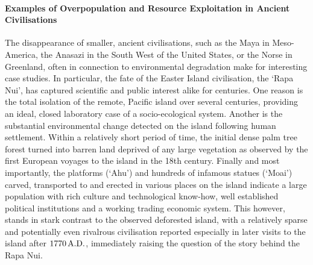 \paragraph{Examples of Overpopulation and Resource Exploitation in Ancient Civilisations}
The disappearance of smaller, ancient civilisations, such as the Maya in Meso-America, the Anasazi in the South West of the United States, or the Norse in Greenland, often in connection to environmental degradation make for interesting case studies.
In particular, the fate of the Easter Island civilisation, the `Rapa Nui', has captured scientific and public interest alike for centuries.
One reason is the total isolation of the remote, Pacific island over several centuries, providing an ideal, closed laboratory case of a socio-ecological system.
Another is the substantial environmental change detected on the island following human settlement.  
Within a relatively short period of time, the initial dense palm tree forest turned into barren land deprived of any large vegetation as observed by the first European voyages to the island in the 18th century.
Finally and most importantly, the platforms (`Ahu') and hundreds of infamous statues (`Moai') carved, transported to and erected in various places on the island indicate a large population with rich culture and technological know-how, well established political institutions and a working trading economic system.
This however, stands in stark contrast to the observed deforested island, with a relatively sparse and potentially even rivalrous civilisation reported especially in later visits to the island after $1770\, {\rm A.D.}$, immediately raising the question of the story behind the Rapa Nui.

